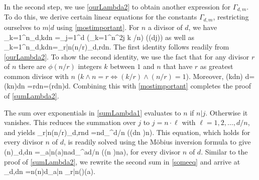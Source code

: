 \documentclass[11pt]{article}
\numberwithin{equation}{section}
\theoremstyle{definition}
\numberwithin{equation}{section}
\def\GA#1#2{\Gamma_{#2,#1}}
\begin{document}
In the second step, we use \eqref{ourLambda2} to obtain another expression for $\GA{m}{d}$. To do this, we derive
certain linear equations for the constants $\GA{m}{d}$, restricting ourselves to $m|d$ using \eqref{mostimportant}. For $n$ a divisor of $d$, we have
\be
\sum_{k=1}^n\GA{k\frac dn}{d}
=\sum_{j=1}^{d} \Big(\sum_{k=1}^n\eE^{2\ir \pi j k /n}\Big) \cos\big(({d\wedge j})\gamma\big)
\label{sumLambda1}
\ee
as well as
\be
\sum_{k=1}^n\GA{k\frac dn}{d}=\sum_{r|n}\phi(n/r)\GA{r\frac dn}{d}.
\label{sumLambda2}
\ee
The first identity follows readily from \eqref{ourLambda2}. To show the second identity, we use the fact that for any divisor $r$ of $n$ there are $\phi(n/r)$ integers $k$ between
$1$ and $n$ that have $r$ as greatest common divisor with $n$ ($k\wedge n=r \Leftrightarrow
(k/r)\wedge (n/r)=1$).
Moreover,
\be
\Big(k\frac dn\Big) \wedge d=(k\wedge n)\frac dn =r\frac dn=\Big(r\frac dn\Big)\wedge d.
\ee
Combining this with \eqref{mostimportant} completes the proof of \eqref{sumLambda2}.

The sum over exponentials in \eqref{sumLambda1} evaluates to $n$ if $n|j$.
Otherwise it vanishes. This reduces the summation over $j$ to $j=n\cdot
\ell$ with $\ell=1, 2,\dots,d/n$, and yields
\be
\sum_{r|n}\phi(n/r)\GA{\frac rnd}{d}
=\frac n{d}\sum_{}^{d/n} \cos\bigg(\Big({\frac dn\wedge
  \ell}\Big)n\gamma\bigg).
\ee
This equation, which holds for every divisor $n$ of $d$, is readily solved using the M\"obius inversion formula to give
\be
\phi(n)\GA{\frac dn}{d}
=\sum_{a|n}\mu(a)\frac n{ad}\sum_{}^{ad/n} \cos\bigg(\Big({n\wedge
  \ell}\Big)\frac na\gamma\bigg),\label{someeq}
\ee
for every divisor $n$ of $d$. Similar to the proof of \eqref{sumLambda2}, we rewrite the second sum in \eqref{someeq} and arrive at
\be
\GA{\frac dn}{d}
=\frac n{\phi(n)d}\sum_{a|n}
\sum_{r|n}\phi\Big(\Big)\cos\Big(a\gamma\Big).
\label{ourformulared}
\ee
\end{document}
